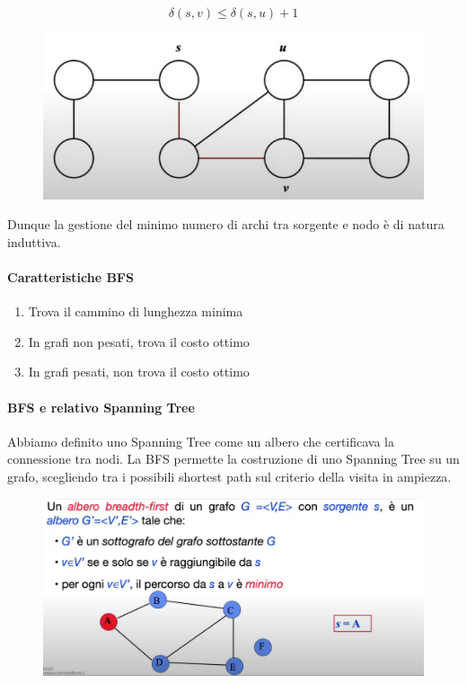 \documentclass{article}
\begin{document}
\begin{equation}
    \delta(s,v) \leq \delta(s,u) + 1 
\end{equation}

\begin{figure}[htbp]
        \center
        \includegraphics[scale=0.55]{img/BFS1.png}
\end{figure}

Dunque la gestione del minimo numero di archi tra sorgente e nodo è di natura induttiva.

\paragraph{Caratteristiche BFS}

\begin{enumerate}
    \item Trova il cammino di lunghezza minima
    \item In grafi non pesati, trova il costo ottimo
    \item In grafi pesati, non trova il costo ottimo
\end{enumerate}

\newpage

\paragraph{BFS e relativo Spanning Tree} 

Abbiamo definito uno Spanning Tree come un albero che certificava la connessione tra nodi. La BFS permette la costruzione di uno Spanning Tree su un grafo, scegliendo tra i possibili shortest path sul criterio della visita in ampiezza.

\begin{figure}[htbp]
        \center
        \includegraphics[scale=0.5]{img/BFS2.png}
\end{figure}
\end{document}
